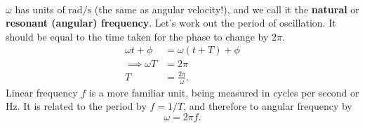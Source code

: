 \documentclass[../classical_mechanics.tex]{subfiles}
\begin{document}
        \paragraph{}
        $\omega$ has units of $\unit{\radian\per\second}$ (the same as angular velocity!), and we call it the \textbf{natural} or \textbf{resonant (angular) frequency}.
        Let's work out the period of oscillation.
        It should be equal to the time taken for the phase to change by $2\pi$.
        \begin{align}
            \omega t+\phi&=\omega(t+T)+\phi\\
            \implies\omega T&=2\pi\\
            T&=\frac{2\pi}{\omega}.
        \end{align}
        Linear frequency $f$ is a more familiar unit, being measured in cycles per second or \unit{\hertz}.
        It is related to the period by $f=1/T$, and therefore to angular frequency by
        \begin{equation}
            \omega=2\pi f.
        \end{equation}
\end{document}
